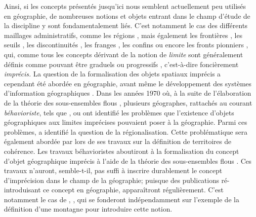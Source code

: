 Ainsi, si les concepts présentés jusqu’ici nous semblent actuellement
peu utilisés en géographie, de nombreuses notions et objets entrant
dans le champ d’étude de la discipline y sont fondamentalement
liés. C’est notamment le cas des différents maillages administratifs,
comme les régions \autocite{Brennetot2014}, mais également les
frontières \autocite{Brunet1992}, les seuils
\autocite{Brunet1992,Levy2013}, les discontinuités
\autocite{Brunet1992,Brunet1997}, les franges \autocite{Brunet1992},
les confins \autocite{Brunet1997} ou encore les fronts pionniers
\autocite{Brunet1992}, qui, comme tous les concepts dérivant de la
notion de \emph{limite} sont généralement définis comme pouvant être
graduels ou progressifs \autocite{Brunet1992,Levy2013}, c’est-à-dire
foncièrement \emph{imprécis.} La question de la formalisation des
objets spatiaux imprécis a cependant été abordée en géographie, avant
même le développement des systèmes d’information géographiques
\autocite{Robinson2003}. Dans les années 1970 où, à la suite de
l’élaboration de la théorie des sous-ensembles flous
\autocite{Zadeh1965}, plusieurs géographes, rattachés au courant
\emph{béhavioriste}, tels que \textcite{Gale1972,Gale1976},
\textcite{Pipkin1978} ou \textcite{Leung1979, Leung1987} ont identifié
les problèmes que l’existence d’objets géographiques aux limites
imprécises pouvaient poser à la géographie. Parmi ces problèmes,
\textcite{Gale1976} a identifié la question de la
régionalisation. Cette problématique sera également abordée par
\textcite{Rolland-May1996,Rolland-May1987} lors de ses travaux sur la
définition de territoires de cohérence. Les travaux béhavioristes
aboutiront à la formalisation du concept d’objet géographique imprécis
à l’aide de la théorie des sous-ensembles flous
\autocite{Leung1987}. Ces travaux n’auront, semble-t-il, pas suffi à
inscrire durablement le concept d’imprécision dans le champ de la
géographie; puisque des publications ré-introduisant ce concept en
géographie, apparaîtront régulièrement. C’est notamment le cas de
\textcite{Fisher1998}, \textcite{Collins2000}, qui se fonderont
indépendamment sur l’exemple de la définition d’une montagne pour
introduire cette notion.


